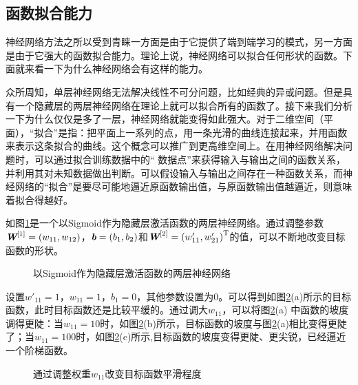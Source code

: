 
\subsection{函数拟合能力}

\parinterval 神经网络方法之所以受到青睐一方面是由于它提供了端到端学习的模式，另一方面是由于它强大的函数拟合能力。理论上说，神经网络可以拟合任何形状的函数。下面就来看一下为什么神经网络会有这样的能力。

\parinterval 众所周知，单层神经网络无法解决线性不可分问题，比如经典的异或问题。但是具有一个隐藏层的两层神经网络在理论上就可以拟合所有的函数了。接下来我们分析一下为什么仅仅是多了一层，神经网络就能变得如此强大。对于二维空间（平面），“拟合”是指：把平面上一系列的点，用一条光滑的曲线连接起来，并用函数来表示这条拟合的曲线。这个概念可以推广到更高维空间上。在用神经网络解决问题时，可以通过拟合训练数据中的“ 数据点”来获得输入与输出之间的函数关系，并利用其对未知数据做出判断。可以假设输入与输出之间存在一种函数关系，而神经网络的“拟合”是要尽可能地逼近原函数输出值，与原函数输出值越逼近，则意味着拟合得越好。


\parinterval 如图\ref{fig:9-18}是一个以Sigmoid作为隐藏层激活函数的两层神经网络。通过调整参数$ {\textbf{\em W}}^{[1]}=(w_{11},w_{12}) $，$ {\textbf{\em b}}=(b_1,b_2) $和$ {\textbf{\em W}}^{[2]}={(w'_{11},w'_{21})}^{\textrm{T}} $的值，可以不断地改变目标函数的形状。


\begin{figure}[htp]
\centering

\caption{以Sigmoid作为隐藏层激活函数的两层神经网络}
\label{fig:9-18}
\end{figure}

\parinterval 设置$ w'_{11}=1 $，$ w_{11}=1 $，$ b_1=0 $，其他参数设置为0。可以得到如图\ref{fig:9-19}(a)所示的目标函数，此时目标函数还是比较平缓的。通过调大$ w_{11} $，可以将图\ref{fig:9-19}(a) 中函数的坡度调得更陡：当$ w_{11}=10 $时，如图\ref{fig:9-19}(b)所示，目标函数的坡度与图\ref{fig:9-19}(a)相比变得更陡了；当$ w_{11}=100 $时，如图\ref{fig:9-19}(c)所示,目标函数的坡度变得更陡、更尖锐，已经逼近一个阶梯函数。

\begin{figure}[htp]
\centering

\caption{通过调整权重$ w_{11} $改变目标函数平滑程度}
\label{fig:9-19}
\end {figure}


